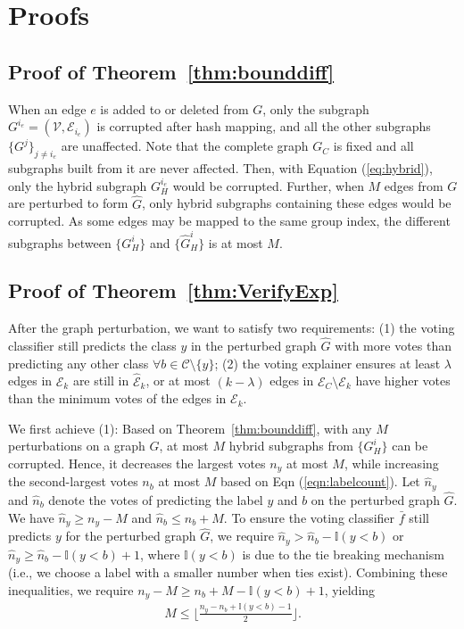 \appendix

\section{Proofs}

\subsection{Proof of Theorem~\ref{thm:bounddiff}}
\label{app:thm:bounddiff}

When an edge $e$ is added to or deleted from $G$, only the subgraph $G^{i_e} = (\mathcal{V}, \mathcal{E}_{i_{e}})$ is corrupted after hash mapping, and all the other subgraphs $\{G^{j}\}_{j\neq i_e}$ are unaffected. Note that the complete graph $G_C$ is fixed and all subgraphs built from it are never affected. 
Then, with Equation (\ref{eq:hybrid}), only the hybrid subgraph $G_H^{i_{e}}$ would be corrupted. 
Further, when $M$ edges from $G$ are perturbed to form $\hat{G}$, only hybrid subgraphs containing these edges would be corrupted. As some edges may be mapped to the same group index, the different subgraphs between $\{ G_H^i\}$ and $\{ \hat{G}_H^i\}$ is at most $M$.


\subsection{Proof of Theorem~\ref{thm:VerifyExp}}
\label{app:thm:VerifyExp}

After the graph perturbation, we want to satisfy two requirements:   
(1) the voting classifier still predicts 
the class $y$ in the perturbed graph $\hat{G}$  with more votes than predicting any other class $\forall b\in \mathcal{C}\setminus\{y\}$; (2)
the voting explainer ensures at least $\lambda$ edges in $\mathcal{E}_k$ are still in $\hat{\mathcal{E}}_k$, or at most $(k-\lambda)$ edges in ${\mathcal{E}}_C \setminus\mathcal{E}_k$ 
have higher votes than the minimum votes of the edges in ${\mathcal{E}}_k$. 


We first achieve (1):  Based on Theorem~\ref{thm:bounddiff}, with any $M$ perturbations on a graph $G$, at most $M$ hybrid subgraphs from $\{G_H^i\}$ can be corrupted. 
Hence, it decreases the largest votes $n_y$ at most $M$, while increasing the second-largest votes $n_{b}$ at most $M$ based on Eqn (\ref{eqn:labelcount}). 
Let $\hat{n}_y$ and $\hat{n}_b$ denote the votes of predicting the label $y$ and $b$ on the perturbed graph $\hat{G}$. We have 
$\hat{n}_y \geq n_y - M$ and $\hat{n}_b \leq n_b + M$. 
To ensure the voting classifier $\bar{f}$ still predicts $y$ for the perturbed graph $\hat{G}$, we require $\hat{n}_y > \hat{n}_b - \mathbb{I}(y<b)$ or $\hat{n}_y \geq \hat{n}_b - \mathbb{I}(y<b) + 1$, where $\mathbb{I}(y<b)$ is due to the tie breaking mechanism (i.e., we  choose a label with a smaller number when ties exist). Combining these inequalities, 
we require $n_y-M \geq n_b+M - \mathbb{I}(y<b) + 1$, yielding
\begin{align}
\label{eqn:reqclassifier}
M \leq \lfloor \frac{n_y-n_{b} + \mathbb{I}(y<b)-1}{2} \rfloor.
\end{align}

